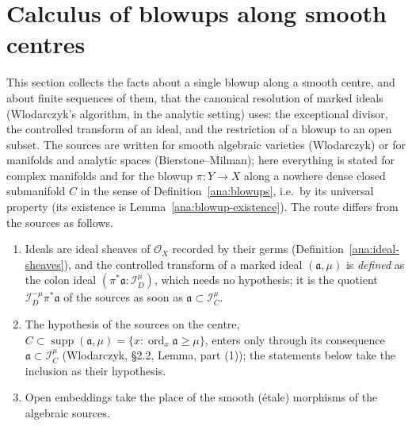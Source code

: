 \section{Calculus of blowups along smooth centres}
\label{sec:blowup-calculus}

This section collects the facts about a single blowup along a smooth centre, and about finite
sequences of them, that the canonical resolution of marked ideals (Wlodarczyk's algorithm, in the analytic setting) uses: the exceptional divisor, the controlled transform of
an ideal, and the restriction of a blowup to an open subset. The sources are written for smooth
algebraic varieties (Wlodarczyk) or for manifolds and analytic spaces (Bierstone--Milman); here
everything is stated for complex manifolds and for the blowup \(\pi\colon Y\to X\) along a
nowhere dense closed submanifold \(C\) in the sense of Definition~\ref{ana:blowups}, i.e.\ by its
universal property (its existence is Lemma~\ref{ana:blowup-existence}). The route differs from the
sources as follows.
\begin{enumerate}
\item Ideals are ideal sheaves of \(\mathcal O_X\) recorded by their germs
(Definition~\ref{ana:ideal-sheaves}), and the controlled transform of a marked ideal
\((\mathfrak a,\mu)\) is \emph{defined} as the colon ideal \((\pi^*\mathfrak a:\mathcal I_D^{\mu})\),
which needs no hypothesis; it is the quotient \(\mathcal I_D^{-\mu}\pi^*\mathfrak a\) of the
sources as soon as \(\mathfrak a\subset\mathcal I_C^{\mu}\).
\item The hypothesis of the sources on the centre, \(C\subset\operatorname{supp}(\mathfrak a,\mu)=
\{x:\operatorname{ord}_x\mathfrak a\ge\mu\}\), enters only through its consequence
\(\mathfrak a\subset\mathcal I_C^{\mu}\) (Wlodarczyk, \S2.2, Lemma, part (1)); the statements below
take the inclusion as their hypothesis.
\item Open embeddings take the place of the smooth (\'etale) morphisms of the algebraic sources.
\end{enumerate}

